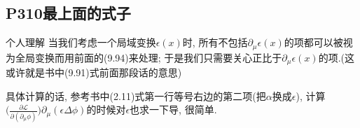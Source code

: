 \subsection{P310最上面的式子}
\begin{mybox}{个人理解}
  当我们考虑一个局域变换$\epsilon(x)$时, 所有不包括$\partial_\mu\epsilon(x)$的项都可以被视为全局变换而用前面的(9.94)来处理; 于是我们只需要关心正比于$\partial_\mu\epsilon(x)$的项.(这或许就是书中(9.91)式前面那段话的意思)

  \mbox{}

  具体计算的话, 参考书中(2.11)式第一行等号右边的第二项(把$\alpha$换成$\epsilon$), 计算$\bigl(\frac{\partial
      \mathcal{L}}{\partial(\partial_\mu\phi)}\bigr)\partial_\mu(\epsilon\Delta\phi)$的时候对$\epsilon$也求一下导, 很简单.
\end{mybox}